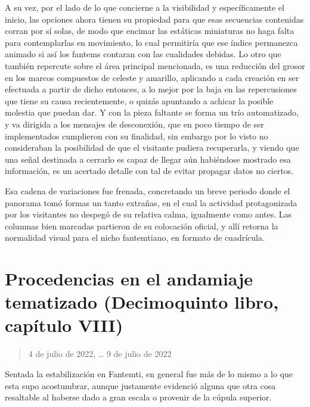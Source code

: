 \documentclass[
]{book}
\begin{document}
A su vez, por el lado de lo que concierne a la visibilidad y específicamente el inicio, las opciones ahora tienen su propiedad para que esas secuencias contenidas corran por sí solas, de modo que encimar las estáticas miniaturas no haga falta para contemplarlas en movimiento, lo cual permitiría que ese índice permanezca animado si así los fantems contaran con las cualidades debidas. Lo otro que también repercute sobre el área principal mencionada, es una reducción del grosor en los marcos compuestos de celeste y amarillo, aplicando a cada creación en ser efectuada a partir de dicho entonces, a lo mejor por la baja en las repercusiones que tiene su causa recientemente, o quizás apuntando a achicar la posible molestia que puedan dar. Y con la pieza faltante se forma un trío automatizado, y va dirigida a los mensajes de desconexión, que en poco tiempo de ser implementados cumplieron con su finalidad, sin embargo por lo visto no consideraban la posibilidad de que el visitante pudiera recuperarla, y viendo que una señal destinada a cerrarlo es capaz de llegar aún habiéndose mostrado esa información, es un acertado detalle con tal de evitar propagar datos no ciertos.

Esa cadena de variaciones fue frenada, concretando un breve periodo donde el panorama tomó formas un tanto extrañas, en el cual la actividad protagonizada por los visitantes no despegó de su relativa calma, igualmente como antes. Las columnas bien marcadas partieron de su colocación oficial, y allí retorna la normalidad visual para el nicho fantemtiano, en formato de cuadrícula.

\hypertarget{procedencias-en-el-andamiaje-tematizado-decimoquinto-libro-capuxedtulo-viii}{%
\section{Procedencias en el andamiaje tematizado (Decimoquinto libro, capítulo VIII)}\label{procedencias-en-el-andamiaje-tematizado-decimoquinto-libro-capuxedtulo-viii}}

\begin{quote}
4 de julio de 2022, \ldots{} 9 de julio de 2022
\end{quote}

Sentada la estabilización en Fantemti, en general fue más de lo mismo a lo que esta supo acostumbrar, aunque justamente evidenció alguna que otra cosa resaltable al haberse dado a gran escala o provenir de la cúpula superior.
\end{document}
